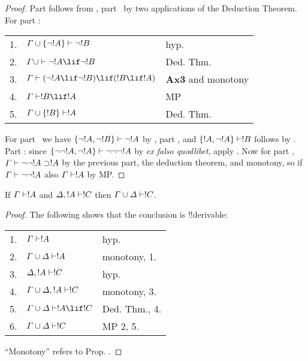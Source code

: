 \documentclass[../../include/open-logic-section]{subfiles}
\begin{document}
\begin{proof} 
Part  follows from ,
part~ by two applications of the
Deduction Theorem. For part :

\begin{tabular}{rll} 
1. & $\Gamma \cup \{ \lnot !A\} \Proves \lnot !B$ &
hyp. \\ 
2. & $\Gamma \cup \Proves \lnot !A \lif \lnot !B$ & Ded. Thm.\\ 
3. & $\Gamma \Proves (\lnot !A \lif \lnot !B) \lif (!B \lif !A)$ &
\textbf{Ax3} and monotony \\ 
4. & $\Gamma \Proves !B \lif !A$ & MP \\ 
5. & $\Gamma \cup \{ !B\} \Proves !A$ & Ded. Thm. 
\end{tabular}
  
\noindent For part~ we have $\{\lnot !A, \lnot !B
\} \Proves \lnot !A$ by , part
, and $\{ !A, \lnot!A\} \Proves !B$ follows
by . Part : since
$\{\lnot\lnot !A, \lnot !A \} \Proves \lnot \lnot\lnot !A$ by \emph{ex
  falso quodlibet}, apply . Now for part
, $\Gamma \Proves \lnot\lnot !A \supset !A$ by the
previous part, the deduction theorem, and monotony, so if $\Gamma
\Proves \lnot\lnot!A$ also $\Gamma \Proves !A$ by MP.
\end{proof}

\begin{thm}[Cut] 
If $\Gamma \Proves !A$ and $\Delta, !A \Proves !C$
then $\Gamma \cup \Delta \Proves !C$. 
\end{thm}

\begin{proof} The following shows that the conclusion is !!{derivable}:

\begin{tabular}{rll} 
1. & $\Gamma \Proves !A$ & hyp. \\ 
2. &$\Gamma\cup\Delta \Proves !A$ & monotony, 1.\\ 
3. & $\Delta, !A \Proves !C$ & hyp. \\ 
4. & $\Gamma \cup \Delta, !A \Proves !C$ & monotony, 3.\\ 
5. & $\Gamma \cup \Delta \Proves !A \lif !C$ & Ded. Thm., 4.\\ 
6. & $\Gamma \cup \Delta \Proves !C$ & MP 2, 5. 
\end{tabular}

\smallskip\noindent ``Monotony'' refers to Prop.
. 
\end{proof}
\end{document}
